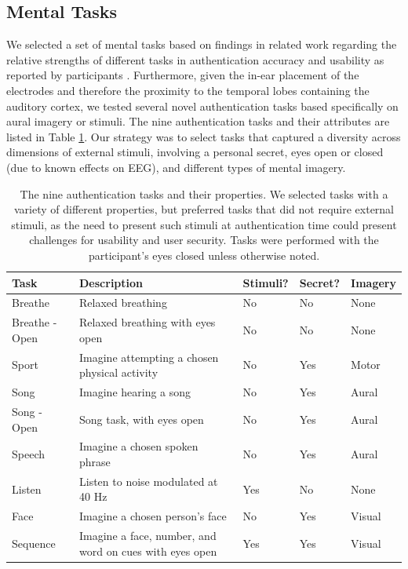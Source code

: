 \documentclass[a4paper,twoside]{article}
\begin{document}
\subsection{Mental Tasks}

\noindent We selected a set of mental tasks based on findings in related work regarding the relative strengths of different tasks in authentication accuracy and usability as reported by participants \cite{Chuang2013b,curran2016passthoughts}. Furthermore, given the in-ear placement of the electrodes and therefore the proximity to the temporal lobes containing the auditory cortex, we tested several novel authentication tasks based specifically on aural imagery or stimuli. The nine authentication tasks and their attributes are listed in Table \ref{tab:tasks}. Our strategy was to select tasks that captured a diversity across dimensions of external stimuli, involving a personal secret, eyes open or closed (due to known effects on EEG), and different types of mental imagery.

\begin{table}
\caption{The nine authentication tasks and their properties. We selected tasks with a variety of different properties, but preferred tasks that did not require external stimuli, as the need to present such stimuli at authentication time could present challenges for usability and user security. Tasks were performed with the participant's eyes closed unless otherwise noted.}
\label{tab:tasks}
\centering
\begin{tabularx}{\textwidth}{lllll}

\textbf{Task} & \textbf{Description} & \textbf{Stimuli}? & \textbf{Secret}? & \textbf{Imagery}\\
\hline
Breathe & Relaxed breathing & No & No & None\\
Breathe - Open & Relaxed breathing with eyes open & No & No & None\\
Sport & Imagine attempting a chosen physical activity & No & Yes & Motor\\
Song & Imagine hearing a song & No & Yes &  Aural\\
Song - Open & Song task, with eyes open & No & Yes & Aural\\
Speech & Imagine a chosen spoken phrase & No & Yes & Aural\\
Listen & Listen to noise modulated at 40 Hz & Yes & No & None\\
Face & Imagine a chosen person's face & No & Yes & Visual\\
Sequence & Imagine a face, number, and word on cues with eyes open & Yes & Yes & Visual\\
\hline
\end{tabularx}
\end{table}
\end{document}
